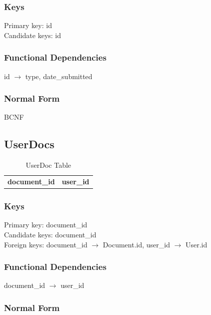 \documentclass[11pt]{article}
\begin{document}
\subsubsection{Keys}
\label{sec-3-8-1}

    
    Primary key: id\\
    Candidate keys: id
\subsubsection{Functional Dependencies}
\label{sec-3-8-2}


    id $\rightarrow$ type, date\_submitted
\subsubsection{Normal Form}
\label{sec-3-8-3}


    BCNF 
\subsection{UserDocs}
\label{sec-3-9}


\begin{table}[htb]
\caption{UserDoc Table} 
\begin{center}
\begin{tabular}{ll}
 \textbf{document\_id}  &  \textbf{user\_id}  \\
\end{tabular}
\end{center}
\end{table}
\subsubsection{Keys}
\label{sec-3-9-1}

    
    Primary key: document\_id\\
    Candidate keys: document\_id\\
    Foreign keys: document\_id $\rightarrow$ Document.id, user\_id $\rightarrow$ User.id
\subsubsection{Functional Dependencies}
\label{sec-3-9-2}


    document\_id $\rightarrow$ user\_id
\subsubsection{Normal Form}
\label{sec-3-9-3}
\end{document}
